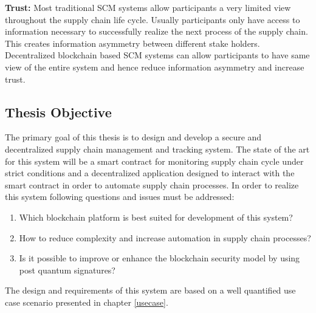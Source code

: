 \textbf{Trust:}
Most traditional SCM systems allow participants a very limited view throughout the supply chain life cycle. Usually participants only have access to information necessary to successfully realize the next process of the supply chain. This creates information asymmetry between different stake holders. Decentralized blockchain based SCM systems can allow participants to have same view of the entire system and hence reduce information asymmetry and increase trust.
\clearpage


\subsection{Thesis Objective}
The primary goal of this thesis is to design and develop a secure and decentralized supply chain management and tracking system. The state of the art for this system will be a smart contract for monitoring supply chain cycle under strict conditions and a decentralized application designed to interact with the smart contract in order to automate supply chain processes. In order to realize this system following questions and issues must be addressed:

\begin{enumerate}[label=(\alph*)]
\item Which blockchain platform is best suited for development of this system?
\item How to reduce complexity and increase automation in supply chain processes?
\item Is it possible to improve or enhance the blockchain security model by using post quantum signatures?
\end{enumerate}
	
The design and requirements of this system are based on a well quantified use case scenario presented in chapter \ref{usecase}. 

